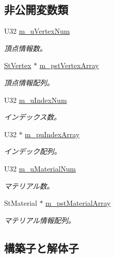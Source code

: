 \subsection*{非公開変数類}
\begin{DoxyCompactItemize}
\item 
U32 \hyperlink{class_c_p_m_d_mesh_a4f1ecf35269d6f92bdbb6a65fbcde9c7}{m\+\_\+u\+Vertex\+Num}
\begin{DoxyCompactList}\small\item\em 頂点情報数。 \end{DoxyCompactList}\item 
\hyperlink{struct_i_mesh_1_1_st_vertex}{St\+Vertex} $\ast$ \hyperlink{class_c_p_m_d_mesh_a3792b619ca88ed6376e3f13bad68309b}{m\+\_\+pst\+Vertex\+Array}
\begin{DoxyCompactList}\small\item\em 頂点情報配列。 \end{DoxyCompactList}\item 
U32 \hyperlink{class_c_p_m_d_mesh_a1bb03d6a05fcc301d52a683d435c0aca}{m\+\_\+u\+Index\+Num}
\begin{DoxyCompactList}\small\item\em インデックス数。 \end{DoxyCompactList}\item 
U32 $\ast$ \hyperlink{class_c_p_m_d_mesh_a2e6da3c8ef74817ba29900609ccd50a2}{m\+\_\+pu\+Index\+Array}
\begin{DoxyCompactList}\small\item\em インデック配列。 \end{DoxyCompactList}\item 
U32 \hyperlink{class_c_p_m_d_mesh_a90141785835f71c11ffe9146eecd1ff6}{m\+\_\+u\+Material\+Num}
\begin{DoxyCompactList}\small\item\em マテリアル数。 \end{DoxyCompactList}\item 
St\+Material $\ast$ \hyperlink{class_c_p_m_d_mesh_af1764e500e746f1271858e18b0e2a7bd}{m\+\_\+pst\+Material\+Array}
\begin{DoxyCompactList}\small\item\em マテリアル情報配列。 \end{DoxyCompactList}\end{DoxyCompactItemize}


\subsection{構築子と解体子}
\hypertarget{class_c_p_m_d_mesh_aa6c81a795b0497efecf17128385f853a}{}
